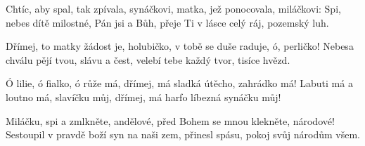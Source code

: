 \vskip-5mm
\IncludeLilypond

Chtíc, aby spal, tak zpívala, synáčkovi,
matka, jež ponocovala, miláčkovi:
Spi, nebes dítě milostné, Pán jsi a Bůh,
přeje Ti v lásce celý ráj, pozemský luh.

Dřímej, to matky žádost je, holubičko,
v tobě se duše raduje, ó, perličko!
Nebesa chválu pějí tvou, slávu a čest,
velebí tebe každý tvor, tisíce hvězd.

Ó lilie, ó fialko, ó růže má,
dřímej, má sladká útěcho, zahrádko má!
Labuti má a loutno má, slavíčku můj,
dřímej, má harfo líbezná synáčku můj!

Miláčku, spi a zmlkněte, andělové,
před Bohem se mnou klekněte, národové!
Sestoupil v pravdě boží syn na naši zem,
přinesl spásu, pokoj svůj národům všem.
